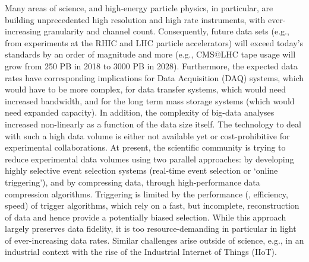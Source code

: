 Many areas of science, and high-energy particle physics, in particular, are building unprecedented high resolution and high rate instruments, with ever-increasing granularity and channel count. Consequently,  future data sets  (e.g., from experiments at the RHIC and LHC particle accelerators) will exceed today's standards by an order of magnitude and more (e.g., CMS@LHC tape usage will grow from 250 PB in 2018 to 3000 PB in 2028). Furthermore, the expected data rates have corresponding implications for  Data Acquisition (DAQ) systems, which would have to be more complex, for data transfer systems, which would need increased bandwidth, and for the long term mass storage systems (which would need expanded capacity). In addition, the complexity of big-data analyses increased non-linearly as a function of the data size itself. The technology to deal with such a high data volume is either not available yet or cost-prohibitive for experimental collaborations. At present, the scientific community is trying to reduce experimental data volumes using two parallel approaches: by developing highly selective event selection systems (\eg real-time event selection or `online triggering'), and by compressing data, through high-performance data compression algorithms. Triggering is limited by the performance (\ie, efficiency, speed) of trigger algorithms, which rely on a fast, but incomplete, reconstruction of data and hence provide a potentially biased selection. While this approach largely preserves data fidelity, it is too resource-demanding in particular in light of ever-increasing data rates. Similar challenges arise outside of science, e.g., in an industrial context with the rise of the Industrial Internet of Things (IIoT).


